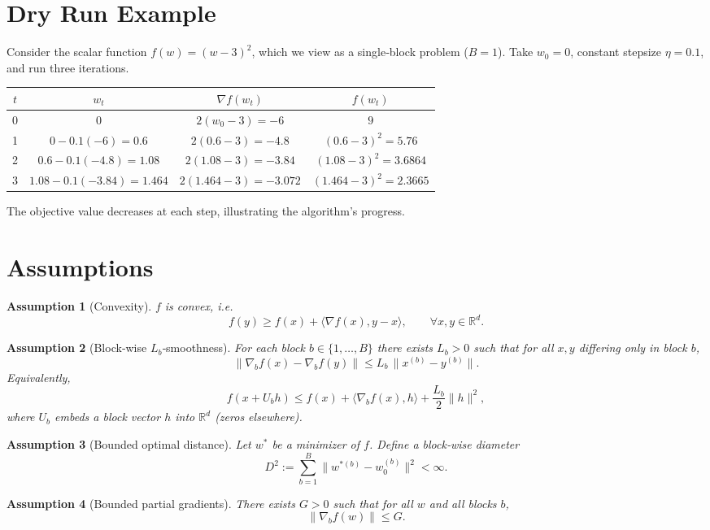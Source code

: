\documentclass{article}
\newtheorem{assumption}{Assumption}
\newcommand{\R}{\mathbb{R}}
\begin{document}
\section*{Dry Run Example}
Consider the scalar function $f(w)=(w-3)^{2}$, which we view as a single‑block problem ($B=1$).  
Take $w_{0}=0$, constant stepsize $\eta=0.1$, and run three iterations.

\begin{center}
\begin{tabular}{c|c|c|c}
$t$ & $w_{t}$ & $\nabla f(w_{t})$ & $f(w_{t})$\\\hline
0 & $0$ & $2(w_{0}-3)=-6$ & $9$\\
1 & $0-0.1(-6)=0.6$ & $2(0.6-3)=-4.8$ & $(0.6-3)^{2}=5.76$\\
2 & $0.6-0.1(-4.8)=1.08$ & $2(1.08-3)=-3.84$ & $(1.08-3)^{2}=3.6864$\\
3 & $1.08-0.1(-3.84)=1.464$ & $2(1.464-3)=-3.072$ & $(1.464-3)^{2}=2.3665$
\end{tabular}
\end{center}
The objective value decreases at each step, illustrating the algorithm’s progress.

\newpage
\section*{Assumptions}
\begin{assumption}[Convexity]\label{ass:conv}
$f$ is convex, i.e.
\[
f(y)\ge f(x)+\langle\nabla f(x),y-x\rangle,\qquad\forall x,y\in\R^{d}.
\]
\end{assumption}
\begin{assumption}[Block‑wise $L_{b}$‑smoothness]\label{ass:smooth}
For each block $b\in\{1,\dots ,B\}$ there exists $L_{b}>0$ such that for all $x,y$ differing only in block $b$,
\[
\|\nabla_{b}f(x)-\nabla_{b}f(y)\| \le L_{b}\,\|x^{(b)}-y^{(b)}\|.
\]
Equivalently,
\[
f(x+U_{b}h)\le f(x)+\langle\nabla_{b}f(x),h\rangle+\frac{L_{b}}{2}\|h\|^{2},
\tag{2}
\]
where $U_{b}$ embeds a block vector $h$ into $\R^{d}$ (zeros elsewhere).
\end{assumption}
\begin{assumption}[Bounded optimal distance]\label{ass:diam}
Let $w^{*}$ be a minimizer of $f$. Define a block‑wise diameter
\[
D^{2}:=\sum_{b=1}^{B}\|w^{*(b)}-w_{0}^{(b)}\|^{2}<\infty .
\]
\end{assumption}
\begin{assumption}[Bounded partial gradients]\label{ass:grad}
There exists $G>0$ such that for all $w$ and all blocks $b$,
\[
\|\nabla_{b}f(w)\|\le G .
\]
\end{assumption}
\end{document}
